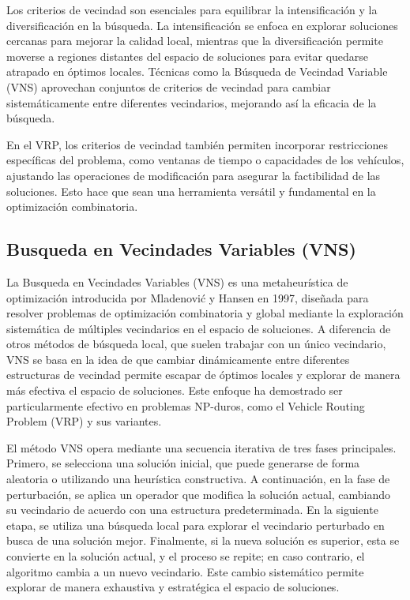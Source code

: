 \documentclass{article}
\begin{document}
Los criterios de vecindad son esenciales para equilibrar la intensificación y la diversificación en la búsqueda. La intensificación se enfoca en explorar soluciones cercanas para mejorar la calidad local, mientras que la diversificación permite moverse a regiones distantes del espacio de soluciones para evitar quedarse atrapado en óptimos locales. Técnicas como la Búsqueda de Vecindad Variable (VNS) aprovechan conjuntos de criterios de vecindad para cambiar sistemáticamente entre diferentes vecindarios, mejorando así la eficacia de la búsqueda.

En el VRP, los criterios de vecindad también permiten incorporar restricciones específicas del problema, como ventanas de tiempo o capacidades de los vehículos, ajustando las operaciones de modificación para asegurar la factibilidad de las soluciones. Esto hace que sean una herramienta versátil y fundamental en la optimización combinatoria.

\subsection{Busqueda en Vecindades Variables (VNS)}

La Busqueda en Vecindades Variables (VNS) es una metaheurística de optimización introducida por Mladenović y Hansen en 1997, diseñada para resolver problemas de optimización combinatoria y global mediante la exploración sistemática de múltiples vecindarios en el espacio de soluciones. A diferencia de otros métodos de búsqueda local, que suelen trabajar con un único vecindario, VNS se basa en la idea de que cambiar dinámicamente entre diferentes estructuras de vecindad permite escapar de óptimos locales y explorar de manera más efectiva el espacio de soluciones. Este enfoque ha demostrado ser particularmente efectivo en problemas NP-duros, como el Vehicle Routing Problem (VRP) y sus variantes.

El método VNS opera mediante una secuencia iterativa de tres fases principales. Primero, se selecciona una solución inicial, que puede generarse de forma aleatoria o utilizando una heurística constructiva. A continuación, en la fase de perturbación, se aplica un operador que modifica la solución actual, cambiando su vecindario de acuerdo con una estructura predeterminada. En la siguiente etapa, se utiliza una búsqueda local para explorar el vecindario perturbado en busca de una solución mejor. Finalmente, si la nueva solución es superior, esta se convierte en la solución actual, y el proceso se repite; en caso contrario, el algoritmo cambia a un nuevo vecindario. Este cambio sistemático permite explorar de manera exhaustiva y estratégica el espacio de soluciones.
\end{document}
